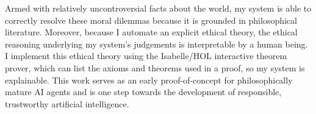 \begin{isabellebody}
\begin{isamarkuptext}
Armed with relatively uncontroversial facts about the world, my system is able to correctly
resolve these moral dilemmas because it is grounded in philosophical literature.
Moreover, because I automate an explicit ethical theory, the ethical reasoning underlying my system's judgements
is interpretable by a human being. I implement this ethical theory using the Isabelle/HOL interactive theorem prover, which can 
list the axioms and theorems used in a proof, so my system is explainable. This work serves as an early 
proof-of-concept for philosophically mature AI agents and is one step towards the development of 
responsible, trustworthy artificial intelligence.%
\end{isamarkuptext}\isamarkuptrue%
%
\isadelimtheory
%
\endisadelimtheory
%
\isatagtheory
%
\endisatagtheory
{\isafoldtheory}%
%
\isadelimtheory
%
\endisadelimtheory
%
\end{isabellebody}%
\endinput
